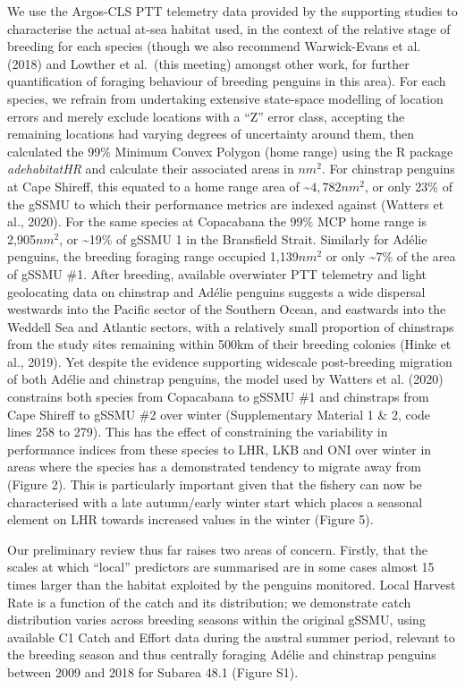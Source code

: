 \documentclass[]{elsarticle} %
\begin{document}
We use the Argos-CLS PTT telemetry data provided by the supporting
studies to characterise the actual at-sea habitat used, in the context
of the relative stage of breeding for each species (though we also
recommend Warwick-Evans et al. (2018) and Lowther et al.~(this meeting)
amongst other work, for further quantification of foraging behaviour of
breeding penguins in this area). For each species, we refrain from
undertaking extensive state-space modelling of location errors and
merely exclude locations with a ``Z'' error class, accepting the
remaining locations had varying degrees of uncertainty around them, then
calculated the 99\% Minimum Convex Polygon (home range) using the R
package \emph{adehabitatHR} and calculate their associated areas in
\(nm^2\). For chinstrap penguins at Cape Shireff, this equated to a home
range area of \textasciitilde{}\(4,782nm^2\), or only 23\% of the gSSMU
to which their performance metrics are indexed against (Watters et al.,
2020). For the same species at Copacabana the 99\% MCP home range is
2,905\(nm^2\), or \textasciitilde19\% of gSSMU 1 in the Bransfield
Strait. Similarly for Adélie penguins, the breeding foraging range
occupied 1,139\(nm^2\) or only \textasciitilde7\% of the area of gSSMU
\#1. After breeding, available overwinter PTT telemetry and light
geolocating data on chinstrap and Adélie penguins suggests a wide
dispersal westwards into the Pacific sector of the Southern Ocean, and
eastwards into the Weddell Sea and Atlantic sectors, with a relatively
small proportion of chinstraps from the study sites remaining within
500km of their breeding colonies (Hinke et al., 2019). Yet despite the
evidence supporting widescale post-breeding migration of both Adélie and
chinstrap penguins, the model used by Watters et al. (2020) constrains
both species from Copacabana to gSSMU \#1 and chinstraps from Cape
Shireff to gSSMU \#2 over winter (Supplementary Material 1 \& 2, code
lines 258 to 279). This has the effect of constraining the variability
in performance indices from these species to LHR, LKB and ONI over
winter in areas where the species has a demonstrated tendency to migrate
away from (Figure 2). This is particularly important given that the
fishery can now be characterised with a late autumn/early winter start
which places a seasonal element on LHR towards increased values in the
winter (Figure 5).

Our preliminary review thus far raises two areas of concern. Firstly,
that the scales at which ``local'' predictors are summarised are in some
cases almost 15 times larger than the habitat exploited by the penguins
monitored. Local Harvest Rate is a function of the catch and its
distribution; we demonstrate catch distribution varies across breeding
seasons within the original gSSMU, using available C1 Catch and Effort
data during the austral summer period, relevant to the breeding season
and thus centrally foraging Adélie and chinstrap penguins between 2009
and 2018 for Subarea 48.1 (Figure S1).
\end{document}
